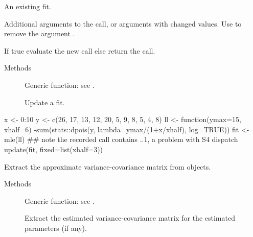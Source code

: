 %
\begin{Arguments}
\begin{ldescription}
\item[\code{object}] An existing fit.
\item[\code{...}] Additional arguments to the call, or arguments with
changed values. Use  to remove the argument .
\item[\code{evaluate}] If true evaluate the new call else return the call.
\end{ldescription}
\end{Arguments}
%
\begin{Section}{Methods}
\begin{description}

\item[] Generic function: see
.
\item[] Update a fit.

\end{description}

\end{Section}
%
\begin{Examples}
\begin{ExampleCode}
x <- 0:10
y <- c(26, 17, 13, 12, 20, 5, 9, 8, 5, 4, 8)
ll <- function(ymax=15, xhalf=6)
    -sum(stats::dpois(y, lambda=ymax/(1+x/xhalf), log=TRUE))
fit <- mle(ll)
## note the recorded call contains ..1, a problem with S4 dispatch
update(fit, fixed=list(xhalf=3))
\end{ExampleCode}
\end{Examples}
%
\begin{Description}\relax
Extract the approximate variance-covariance matrix from 
objects.
\end{Description}
%
\begin{Section}{Methods}
\begin{description}

\item[] Generic function: see
.
\item[] Extract the estimated
variance-covariance matrix for the estimated parameters (if any).

\end{description}

\end{Section}
\clearpage
